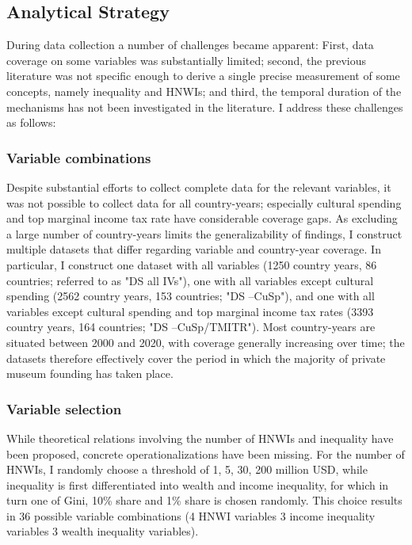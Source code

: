 \documentclass[11pt]{article}
\begin{document}
\subsection*{Analytical Strategy}


During data collection a number of challenges became apparent:
First, data coverage on some variables was substantially limited; second, the previous literature was not specific enough to derive a single precise measurement of some concepts, namely inequality and HNWIs; and third, the temporal duration of the mechanisms has not been investigated in the literature. 
I address these challenges as follows: 

\subsubsection*{Variable combinations}

Despite substantial efforts to collect complete data for the relevant variables, it was not possible to collect data for all country-years; especially cultural spending and top marginal income tax rate have considerable coverage gaps.
As excluding a large number of country-years limits the generalizability of findings, I construct multiple datasets that differ regarding variable and country-year coverage.
In particular, I construct one dataset with all variables (1250 country years, 86 countries; referred to as "DS all IVs"), one with all variables except cultural spending (2562 country years, 153 countries; "DS --CuSp"), and one with all variables except cultural spending and top marginal income tax rates (3393 country years, 164 countries; "DS --CuSp/TMITR").
Most country-years are situated between 2000 and 2020, with coverage generally increasing over time; the datasets therefore effectively cover the period in which the majority of private museum founding has taken place.
\begin{landscape}

\end{landscape}


\subsubsection*{Variable selection}

While theoretical relations involving the number of HNWIs and inequality have been proposed, concrete operationalizations have been missing.
For the number of HNWIs, I randomly choose a threshold of 1, 5, 30, 200 million USD, while inequality is first differentiated into wealth and income inequality, for which in turn one of Gini, 10\% share and 1\% share is chosen randomly.
This choice results in 36 possible variable combinations (4 HNWI variables \texttimes{} 3 income inequality variables \texttimes{} 3 wealth inequality variables). 
\end{document}
